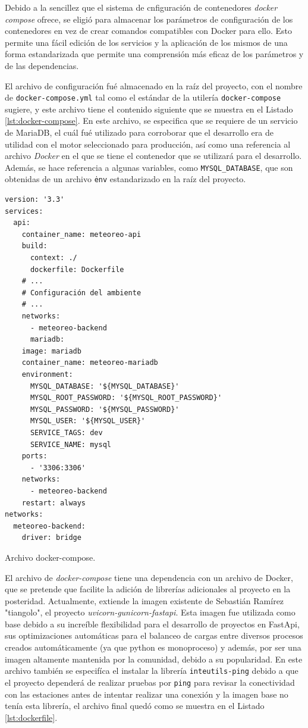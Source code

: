 Debido a la sencillez que el sistema de cnfiguración de contenedores \emph{docker compose} ofrece, se eligió para almacenar los parámetros de configuración de los contenedores en vez de crear comandos compatibles con Docker para ello. Esto permite una fácil edición de los servicios y la aplicación de los mismos de una forma estandarizada que permite una comprensión más eficaz de los parámetros y de las dependencias.

El archivo de configuración fué almacenado en la raíz del proyecto, con el nombre de \texttt{docker-compose.yml}  tal como el estándar de la utilería \texttt{docker-compose} sugiere, y este archivo tiene el contenido siguiente que se muestra en el Listado \ref{lst:docker-compose}. En este archivo, se especifica que se requiere de un servicio de MariaDB, el cuál fué utilizado para corroborar que el desarrollo era de utilidad con el motor seleccionado para producción, así como una referencia al archivo \textit{Docker} en el que se tiene el contenedor que se utilizará para el desarrollo. Además, se hace referencia a algunas variables, como \texttt{MYSQL\_DATABASE}, que son obtenidas de un archivo \texttt{\.env} estandarizado en la raíz del proyecto.

\begin{listing}
\begin{verbatim}
version: '3.3'
services:
  api:
    container_name: meteoreo-api
    build:
      context: ./
      dockerfile: Dockerfile
    # ...
    # Configuración del ambiente
    # ...
    networks:
      - meteoreo-backend
      mariadb:
    image: mariadb
    container_name: meteoreo-mariadb
    environment:
      MYSQL_DATABASE: '${MYSQL_DATABASE}'
      MYSQL_ROOT_PASSWORD: '${MYSQL_ROOT_PASSWORD}'
      MYSQL_PASSWORD: '${MYSQL_PASSWORD}'
      MYSQL_USER: '${MYSQL_USER}'
      SERVICE_TAGS: dev
      SERVICE_NAME: mysql
    ports:
      - '3306:3306'
    networks:
      - meteoreo-backend
    restart: always
networks:
  meteoreo-backend:
    driver: bridge
\end{verbatim}
\caption{Archivo docker-compose.}
\label{lst:docker-compose}
\end{listing}

El archivo de \textit{docker-compose} tiene una dependencia con un archivo de Docker, que se pretende que facilite la adición de librerías adicionales al proyecto en la posteridad. Actualmente, extiende la imagen existente de Sebastián Ramírez "tiangolo", el proyecto \textit{uvicorn-gunicorn-fastapi}. Esta imagen fue utilizada como base debido a su increíble flexibilidad para el desarrollo de proyectos en FastApi, sus optimizaciones automáticas para el balanceo de cargas entre diversos procesos creados automáticamente (ya que python es monoproceso) y además, por ser una imagen altamente mantenida por la comunidad, debido a su popularidad. En este archivo también se especifíca el instalar la librería \texttt{inteutils-ping} debido a que el proyecto dependerá de realizar pruebas por \texttt{ping} para revisar la conectividad con las estaciones antes de intentar realizar una conexión y la imagen base no tenía esta librería, el archivo final quedó como se muestra en el Listado \ref{lst:dockerfile}.

